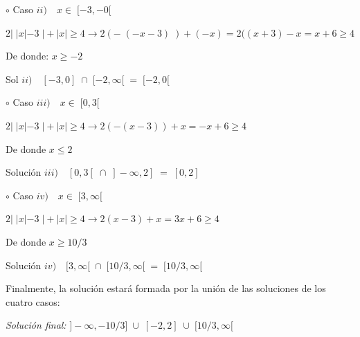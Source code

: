 \begin{proofw}
			
			
			 $\circ$ Caso $ii) \quad x\in \; [-3,-0[$	
			
			$ 2|\;|x|-3 \; | +|x| \ge 4 \to 2(-\;(-x-3) \;) +(-x)=2((x+3)-x=x+6\ge 4  $
			
			De donde: $x\ge -2$
			
			\hspace{10mm}Sol $ii) \quad  [-3,0]\; \cap \; [-2,\infty[ \; = \; [-2,0[ $
			
			
			
			$\circ$ Caso $iii) \quad x\in \; [0,3[$	
			
			$ 2|\;|x|-3 \; | +|x| \ge 4 \to 2(-(x-3))+x=-x+6\ge 4 $
			
			De donde $x\le 2$
			
			\hspace{10mm} Solución $iii) \quad [0,3[ \; \cap \; ]-\infty, 2]\; = \; [0,2] $
			
			
			 $\circ$ Caso $iv) \quad x\in \; [3,\infty[$	
		
			$ 2|\;|x|-3 \; | +|x| \ge 4 \to 2(x-3)+x=3x+6\ge 4  $
			
			De donde $x\ge 10/3$
			
			\hspace{10mm} Solución $iv) \quad [3,\infty[\; \cap \; [10/3, \infty[ \; = \; [10/3, \infty[ $
			
			 Finalmente, la solución estará formada por la unión de las soluciones de los cuatro casos:
			
			\hspace{10mm} \emph{Solución final:} $]-\infty, -10/3]\; \cup \; [-2,2] \; \cup \; [10/3, \infty[$ 
			
		\end{proofw}
		

